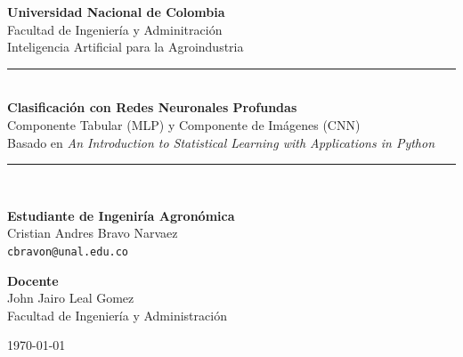 \documentclass[12pt, a4paper]{article}
\begin{document}
\begin{titlepage}
  \centering
  \vspace*{1.2cm}

  {\large \textbf{Universidad Nacional de Colombia}}\\[0.3cm]
  {\normalsize Facultad de Ingeniería y Adminitración}\\[0.2cm]
  {\normalsize Inteligencia Artificial para la Agroindustria}\\[2.2cm]

  \rule{\linewidth}{1pt}\\[0.5cm]
  {\LARGE \textbf{Clasificación con Redes Neuronales Profundas}}\\[0.4cm]
  {\Large Componente Tabular (MLP) y Componente de Imágenes (CNN)}\\[0.4cm]
  {\normalsize Basado en \textit{An Introduction to Statistical Learning
    with Applications in Python} \citep{islp2023}}\\[0.4cm]
  \rule{\linewidth}{1pt}\\[2.0cm]

  \begin{minipage}{0.48\textwidth}
    \centering
    \textbf{Estudiante de Ingeniría Agronómica}\\[0.2cm]
    Cristian Andres Bravo Narvaez\\[0.1cm]
    {\small \texttt{cbravon@unal.edu.co}}
  \end{minipage}
  \hfill
  \begin{minipage}{0.48\textwidth}
    \centering
    \textbf{Docente}\\[0.2cm]
    John Jairo Leal Gomez\\[0.1cm]
    {\small Facultad de Ingeniería y Administración}
  \end{minipage}

  \vfill
  {\normalsize \today}
\end{titlepage}

\begin{abstract}
\noindent
Este informe describe la implementación y evaluación de dos
arquitecturas de redes neuronales profundas para problemas de
clasificación supervisada: un Perceptrón Multicapa (MLP) aplicado al
conjunto de datos tabulares \texttt{phpnThNfi.arff} (4\,839
instancias, 2 clases), y una Red Neuronal Convolucional (CNN) aplicada
al dataset \texttt{potato\_subset} (456 imágenes RGB, 3 clases de
enfermedades en papa). Ambos modelos fueron implementados en Python
con PyTorch, siguiendo los principios metodológicos del libro
\textit{An Introduction to Statistical Learning with Applications in
Python} \citep{islp2023}. El MLP alcanzó una \textit{accuracy} del
\textbf{98.86\%} y la CNN del \textbf{94.57\%}. Se analizan las
decisiones de diseño de la arquitectura, el preprocesamiento de datos,
las estrategias de regularización y las métricas de evaluación,
conectando cada decisión con los temas estudiados en el curso.
\end{abstract}
\end{document}
